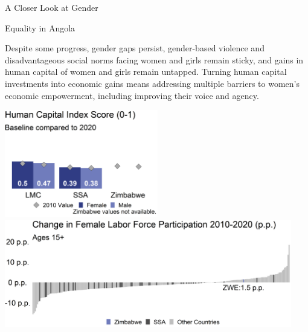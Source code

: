 \documentclass[
]{article}
\begin{document}
\begin{minipage}[c][1.4cm][t]{19.5cm}
\begin{minipage}[c][1.4cm][t]{6.5cm}
\fontsize{14}{1}\selectfont   
A Closer Look at Gender
  
\vspace{.2cm}
  
Equality in Angola
\normalsize
\end{minipage}
\begin{minipage}[c][1.4cm][t]{12.75cm}
\fontsize{9}{8}\selectfont   
Despite some progress, gender gaps persist, gender-based violence and disadvantageous social norms facing women and girls remain sticky, and gains in human capital of women and girls remain untapped. Turning human capital investments into economic gains means addressing multiple barriers to women’s economic empowerment, including improving their voice and agency.
\normalsize
\end{minipage}
\end{minipage}

\vspace{.4cm}

\begin{minipage}[t][4.7cm][t]{19.5cm}
\href{https://genderdata.worldbank.org/indicators/hd-hci-ovrl}{\includegraphics[height=4.7cm]{HCIplot.png}}\hspace{.2cm}
\href{https://genderdata.worldbank.org/indicators/sl-tlf-acti-zs/}{\includegraphics[height=4.7cm]{LFPplot.png}}  
\end{minipage}

\vspace{.2cm}
\end{document}
